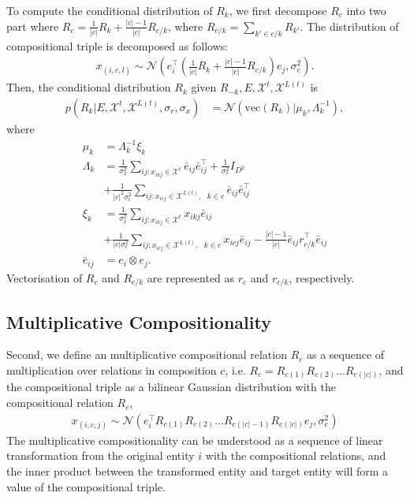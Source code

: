 To compute the conditional distribution of $R_k$, we first decompose $R_c$ into two part where $R_c = 
\frac{1}{|c|} R_k + \frac{|c|-1}{|c|}R_{c/k}$, where $R_{c/k} = \sum_{k' \in c/k} R_{k'}$. 
The distribution of compositional triple is decomposed as follows:
\begin{align}
x_{(i, c, l)} \sim \mathcal{N}(e_i^\top (\frac{1}{|c|} R_k + \frac{|c|-1}{|c|}R_{c/k}) e_j, \sigma_{c}^2).
\end{align}
Then, the conditional distribution $R_k$ given $R_{-k}, E, \mathcal{X}^{t}, \mathcal{X}^{L(t)}$ is
\begin{align}
\label{eqn:comp_cond_r}
p(R_k|E, \mathcal{X}^{t}, \mathcal{X}^{L(t)}, \sigma_r, \sigma_x)  &= \mathcal{N}(\text{vec}(R_k) | \mu_k, 
\Lambda_k^{-1}),
\end{align}
where
\begin{align*}
\mu_k &=\Lambda_k^{-1}\xi_k \\
\Lambda_k &= \frac{1}{\sigma_x^2} \sum_{ij:x_{ikj} \in \mathcal{X}^{t}} \bar{e}_{ij}\bar{e}_{ij}^\top + \frac{1}
{\sigma_r^2} {I}_{D^2} \\
& +\frac{1}{|c|^2 \sigma_c^2} \sum_{ij:x_{icj} \in \mathcal{X}^{L(t)},\text{ }k \in c} \bar{e}_{ij} \bar{e}_{ij}^\top \\
\xi_k &=  \frac{1}{\sigma_x^2}\sum_{ij:x_{ikj} \in \mathcal{X}^{t}} x_{ikj} \bar{e}_{ij}\\
& +\frac{1}{|c| \sigma_c^2} \sum_{ij:x_{icj} \in \mathcal{X}^{L(t)},\text{ }k \in c} x_{icj} \bar{e}_{ij} - \frac{|c|-1}{|c|} 
\bar{e}_{ij} r_{c/k}^\top \bar{e}_{ij}\\
\bar{e}_{ij} &= e_{i} \otimes e_{j}.
\end{align*}
Vectorisation of $R_c$ and $R_{c/k}$ are represented as $r_c$ and $r_{c/k}$, respectively.


\subsection{Multiplicative Compositionality}
Second, we define an multiplicative compositional relation $R_c$ as a sequence of multiplication over 
relations in composition $c$, i.e. $R_c = R_{c(1)} R_{c(2)} \dots R_{c(|c|)}$, and the compositional triple as a 
bilinear Gaussian distribution with the compositional relation $R_c$,
\begin{align}
x_{(i, c, j)} \sim \mathcal{N}(e_i^\top R_{c(1)}R_{c(2)} \dots R_{c(|c|-1)}R_{c(|c|)} e_j, \sigma_{c}^2)
\end{align}
The multiplicative compositionality can be understood as a sequence of linear transformation from the original 
entity $i$ with the compositional relations, and the inner product between the transformed entity and target 
entity will form a value of the compositional triple.

